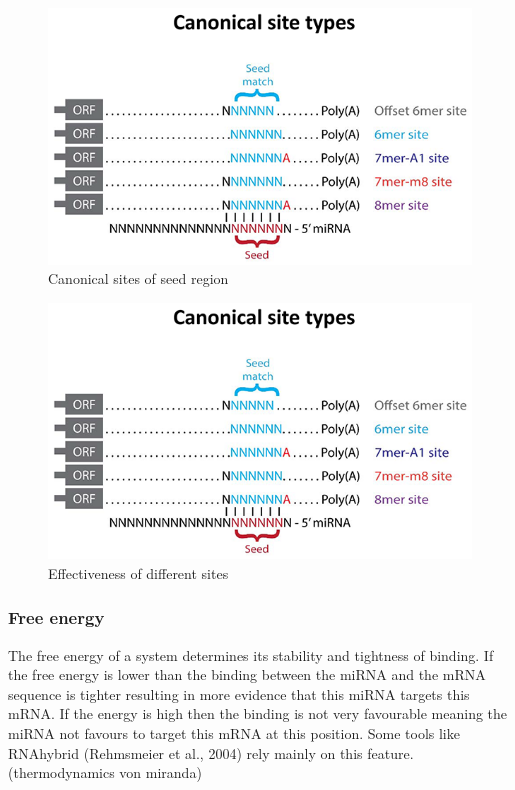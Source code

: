 \documentclass[12pt]{article}
\begin{document}
\begin{figure}
\centering
\includegraphics[scale=2.3]{results/canonical_sites.png}
\caption{Canonical sites of seed region}
\label{Fig:canonical}
\end{figure}


\begin{figure}
\includegraphics[scale=1]{results/canonical_sites.png}
\caption{Effectiveness of different sites}
\label{types}
\end{figure}

\subsubsection{Free energy}
The free energy of a system determines its stability and tightness of binding. If the free energy is lower than the binding between the miRNA and the mRNA sequence is tighter resulting in more evidence that this miRNA targets this mRNA. If the energy is high then the binding is not very favourable meaning the miRNA not favours to target this mRNA at this position. Some tools like RNAhybrid (Rehmsmeier et al., 2004) rely mainly on this feature. (thermodynamics von miranda)
 
\end{document}
